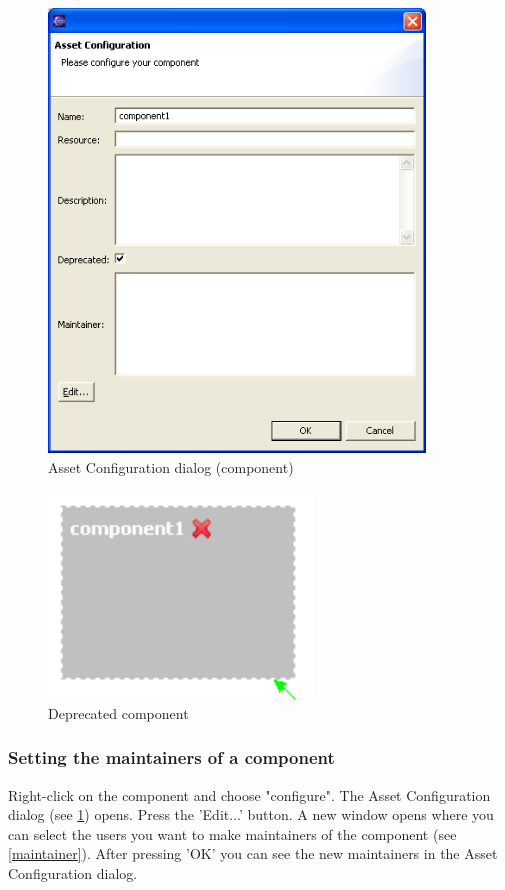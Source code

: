\begin{figure}[h!]
\begin{center}
\includegraphics[width=10cm]{config.png}
   \caption{Asset Configuration dialog (component)}
\label{config}
\end{center}
\end{figure}\par

\begin{figure}[h!]
\begin{center}
\includegraphics[width=7cm]{deprecated.png}
   \caption{Deprecated component}
\label{deprecated}
\end{center}
\end{figure}\par


\subsubsection{Setting the maintainers of a component}
Right-click on the component and choose "configure". The Asset Configuration dialog (see \ref{config}) opens.
Press the 'Edit...' button. A new window opens where you can select the users you want to make maintainers of
the component (see \ref{maintainer}). After pressing 'OK' you can see the new maintainers in the Asset Configuration
dialog.

